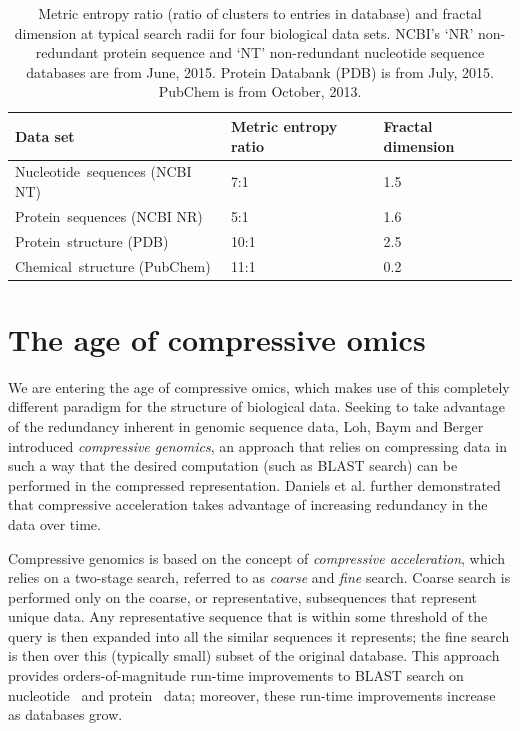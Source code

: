 \documentclass{acm_proc_article-sp}
\begin{document}
\begin{table}
\label{fractal}
\caption{Metric entropy ratio (ratio of clusters to entries in database) and
fractal dimension at typical search radii for four biological data sets.
NCBI's `NR' non-redundant protein sequence and `NT' non-redundant nucleotide sequence databases are from June, 2015. Protein Databank (PDB) is from July, 2015. PubChem is from October, 2013.}
\tabcolsep=0.11cm
\begin{tabular}{H{3.0cm}p{2.2cm}p{1.8cm}}
\hline
Data set & Metric entropy ratio & Fractal dimension \\        
\hline
Nucleotide~sequences (NCBI NT) & 7:1 & 1.5\\
\hline
Protein~sequences (NCBI NR) & 5:1 & 1.6\\
\hline
Protein~structure (PDB) & 10:1 & 2.5\\
\hline
Chemical~structure (PubChem) & 11:1 & 0.2\\
\hline
\end{tabular}
\end{table}

\section{The age of compressive omics}\label{omics}

We are entering the age of compressive omics, 
which makes use of this completely different paradigm for the structure of biological data.
Seeking to take advantage of the redundancy inherent in genomic sequence data, 
Loh, Baym and Berger \cite{loh2012compressive}
introduced \emph{compressive genomics}, an approach that relies on compressing
data in such a way that the desired computation (such as BLAST search) can be
performed in the compressed representation.
Daniels et al. \cite{daniels2013compressive} further demonstrated that
compressive acceleration takes advantage of increasing redundancy in the
data over time.

Compressive genomics is based on the concept of \emph{compressive acceleration},
which relies on a two-stage search, referred to as \emph{coarse} and \emph{fine} search.
Coarse search is performed only on the coarse, or representative, subsequences
that represent unique data.
Any representative sequence that is within some threshold of the query is then expanded 
into all the similar sequences it represents; the fine search is then over this
(typically small) subset of the original database.
This approach provides orders-of-magnitude run-time improvements to BLAST search on 
nucleotide~\cite{loh2012compressive} and protein~\cite{daniels2013compressive}
data; moreover, these run-time improvements increase as databases grow.
\end{document}
